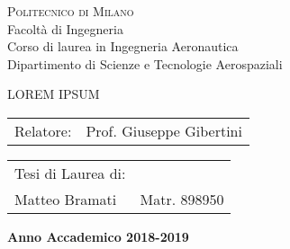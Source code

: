 
\thispagestyle{empty}
\enlargethispage{60mm}
\begin{center}
\Large{\textsc{Politecnico di Milano}}\\
\large{Facolt\`a di Ingegneria}\\
\large{Corso di laurea in Ingegneria Aeronautica}\\
\large{Dipartimento di Scienze e Tecnologie Aerospaziali}\\
\vspace{7mm}
\begin{figure}[h]
\begin{center}
\end{center}
\end{figure}
\vspace{2mm}

\begin{LARGE}
LOREM IPSUM
\end{LARGE}
\vspace{25mm}

\begin{flushleft}
\begin{tabular}{l l }
Relatore:    & Prof. Giuseppe Gibertini\\
\end{tabular}
\end{flushleft}
\vspace{25mm}

\begin{flushright}
\begin{tabular}{l l }
Tesi di Laurea di: & \\
Matteo Bramati & Matr. 898950
\end{tabular}
\end{flushright}
\vspace{43mm}
{\large{\bf Anno Accademico 2018-2019}}
\end{center}